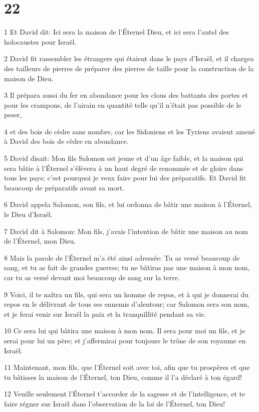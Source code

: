 \chapter{22}

\par 1 Et David dit: Ici sera la maison de l'Éternel Dieu, et ici sera l'autel des holocaustes pour Israël.
\par 2 David fit rassembler les étrangers qui étaient dans le pays d'Israël, et il chargea des tailleurs de pierres de préparer des pierres de taille pour la construction de la maison de Dieu.
\par 3 Il prépara aussi du fer en abondance pour les clous des battants des portes et pour les crampons, de l'airain en quantité telle qu'il n'était pas possible de le peser,
\par 4 et des bois de cèdre sans nombre, car les Sidoniens et les Tyriens avaient amené à David des bois de cèdre en abondance.
\par 5 David disait: Mon fils Salomon est jeune et d'un âge faible, et la maison qui sera bâtie à l'Éternel s'élèvera à un haut degré de renommée et de gloire dans tous les pays; c'est pourquoi je veux faire pour lui des préparatifs. Et David fit beaucoup de préparatifs avant sa mort.
\par 6 David appela Salomon, son fils, et lui ordonna de bâtir une maison à l'Éternel, le Dieu d'Israël.
\par 7 David dit à Salomon: Mon fils, j'avais l'intention de bâtir une maison au nom de l'Éternel, mon Dieu.
\par 8 Mais la parole de l'Éternel m'a été ainsi adressée: Tu as versé beaucoup de sang, et tu as fait de grandes guerres; tu ne bâtiras pas une maison à mon nom, car tu as versé devant moi beaucoup de sang sur la terre.
\par 9 Voici, il te naîtra un fils, qui sera un homme de repos, et à qui je donnerai du repos en le délivrant de tous ses ennemis d'alentour; car Salomon sera son nom, et je ferai venir sur Israël la paix et la tranquillité pendant sa vie.
\par 10 Ce sera lui qui bâtira une maison à mon nom. Il sera pour moi un fils, et je serai pour lui un père; et j'affermirai pour toujours le trône de son royaume en Israël.
\par 11 Maintenant, mon fils, que l'Éternel soit avec toi, afin que tu prospères et que tu bâtisses la maison de l'Éternel, ton Dieu, comme il l'a déclaré à ton égard!
\par 12 Veuille seulement l'Éternel t'accorder de la sagesse et de l'intelligence, et te faire régner sur Israël dans l'observation de la loi de l'Éternel, ton Dieu!

